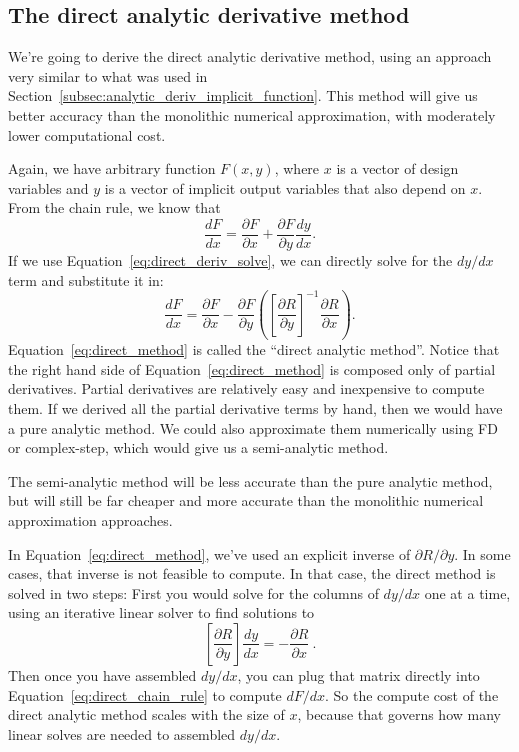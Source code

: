 \documentclass[conf]{new-aiaa}
\begin{document}
    \subsection{The direct analytic derivative method}

    We're going to derive the direct analytic derivative method, using an approach very similar to what was used in Section~\ref{subsec:analytic_deriv_implicit_function}. 
    This method will give us better accuracy than the monolithic numerical approximation, with moderately lower computational cost. 

    Again, we have arbitrary function $F(x,y)$, where $x$ is a vector of design variables and $y$ is a vector of implicit output variables that also depend on $x$. 
    From the chain rule, we know that
    \begin{equation}
      \frac{d F}{d x} = \frac{\partial F}{\partial x} + \frac{\partial F}{\partial y}\frac{d y}{d x} .
      \label{eq:direct_chain_rule}
    \end{equation} 
    If we use Equation~\eqref{eq:direct_deriv_solve}, we can directly solve for the $dy/dx$ term and substitute it in: 
    \begin{equation}
      \frac{d F}{d x} = \frac{\partial F}{\partial x} - \frac{\partial F}{\partial y} \left( \left[\frac{\partial R}{\partial y}\right]^{-1} \frac{\partial R}{\partial x} \right).
      \label{eq:direct_method}
    \end{equation}
    Equation~\ref{eq:direct_method} is called the ``direct analytic method''. 
    Notice that the right hand side of Equation~\ref{eq:direct_method} is composed only of partial derivatives. 
    Partial derivatives are relatively easy and inexpensive to compute them. 
    If we derived all the partial derivative terms by hand, then we would have a pure analytic method. 
    We could also approximate them numerically using FD or complex-step, which would give us a semi-analytic method. 

    The semi-analytic method will be less accurate than the pure analytic method, but will still be far cheaper and more accurate than the monolithic numerical approximation approaches. 

    In Equation~\ref{eq:direct_method}, we've used an explicit inverse of $\partial R/\partial y$. 
    In some cases, that inverse is not feasible to compute. In that case, the direct method is solved in two steps: 
    First you would solve for the columns of $dy/dx$ one at a time, using an iterative linear solver to find solutions to
    \begin{equation}
    \left[\frac{\partial R}{\partial y}\right] \frac{dy}{dx} = - \frac{\partial R}{\partial x} \ . 
    \end{equation}
    Then once you have assembled $dy/dx$, you can plug that matrix directly into Equation~\eqref{eq:direct_chain_rule} to compute $dF/dx$. 
    So the compute cost of the direct analytic method scales with the size of $x$, because that governs how many linear solves are needed to assembled $dy/dx$. 
\end{document}
